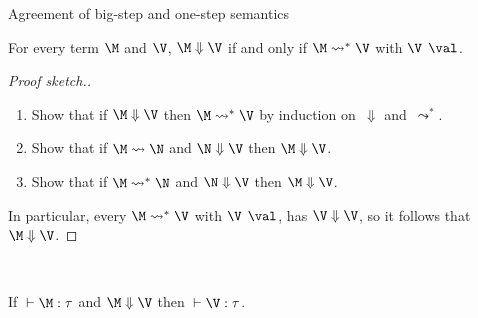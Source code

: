 \begin{frame}{Agreement of big-step and one-step semantics}
  \begin{theorem}
    For every term $\M$ and $\V$, $\M \Downarrow \V$ if and only if $ \M \leadsto^* \V$
    with $\V \;\, \val$. 
  \end{theorem}

  \begin{proof}[Proof sketch.]
    \begin{enumerate}
      \item Show that if $\M\Downarrow \V$ then $\M \leadsto^* \V$
        by induction on~$\Downarrow$ and~$\leadsto^*$. 
      \item Show that if $\M \leadsto \N$ and $\N \Downarrow \V$ then
          $\M\Downarrow \V$.
      \item Show that if $\M \leadsto^*\N$ and $\N \Downarrow \V$ then
        $\M\Downarrow \V$.
    \end{enumerate}
    In particular, every $\M \leadsto^* \V$ with $\V\;\,\val$,
    has $\V\Downarrow \V$, so it follows that $\M\Downarrow \V$.
  \end{proof}
  ~\\

  \begin{corollary}
    If ${}\vdash \M : \tau$ and $\M \Downarrow \V$ then ${}\vdash \V : \tau$.
  \end{corollary}
\end{frame}


